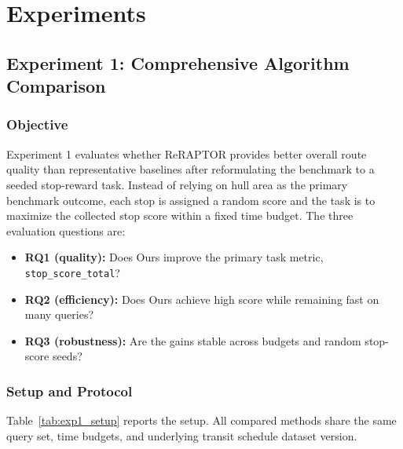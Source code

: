 \section{Experiments}
\subsection{Experiment 1: Comprehensive Algorithm Comparison}
\subsubsection{Objective}
Experiment 1 evaluates whether ReRAPTOR provides better overall route quality
than representative baselines after reformulating the benchmark to a
seeded stop-reward task.
Instead of relying on hull area as the primary benchmark outcome, each stop is
assigned a random score and the task is to maximize the collected stop score
within a fixed time budget.
The three evaluation questions are:
\begin{itemize}[leftmargin=1.5em]
    \item \textbf{RQ1 (quality):} Does Ours improve the primary task metric, \texttt{stop\-\_score\-\_total}?
    \item \textbf{RQ2 (efficiency):} Does Ours achieve high score while remaining fast on many queries?
    \item \textbf{RQ3 (robustness):} Are the gains stable across budgets and random stop-score seeds?
\end{itemize}

\subsubsection{Setup and Protocol}
Table~\ref{tab:exp1_setup} reports the setup.
All compared methods share the same query set, time budgets, and underlying
transit schedule dataset version.


